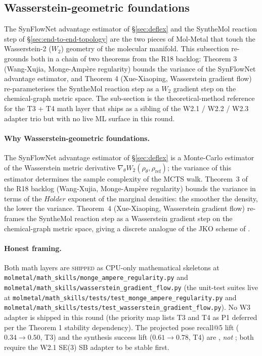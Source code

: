 \subsection{Wasserstein-geometric foundations}
\label{sec:method:wasserstein-foundations}

The SynFlowNet advantage estimator of \S\ref{sec:deflex} and the
SyntheMol reaction step of \S\ref{sec:end-to-end-topology} are the
two pieces of Mol-Metal that touch the Wasserstein-2 ($W_2$)
geometry of the molecular manifold.  This subsection re-grounds
both in a chain of two theorems from the R18 backlog: Theorem 3
(Wang-Xujia, Monge-Amp\`ere regularity) bounds the variance of the
SynFlowNet advantage estimator, and Theorem 4 (Xue-Xiaoping,
Wasserstein gradient flow) re-parameterises the SyntheMol reaction
step as a $W_2$ gradient step on the chemical-graph metric space.
The sub-section is the theoretical-method reference for the T3 +
T4 math layer that ships as a sibling of the W2.1 / W2.2 / W2.3
adapter trio but with no live ML surface in this round.

\paragraph{Why Wasserstein-geometric foundations.}
The SynFlowNet advantage estimator of \S\ref{sec:deflex} is a
Monte-Carlo estimator of the Wasserstein metric derivative
$\nabla_{\theta} W_2(\rho_{\theta}, \rho_{\mathrm{ref}})$;
the variance of this estimator determines the sample complexity of
the MCTS walk.  Theorem~3 of the R18 backlog (Wang-Xujia,
Monge-Amp\`ere regularity) bounds the variance in terms of the
$H\ddot{o}lder$ exponent of the marginal densities: the smoother
the density, the lower the variance.  Theorem~4 (Xue-Xiaoping,
Wasserstein gradient flow) re-frames the SyntheMol reaction step
as a Wasserstein gradient step on the chemical-graph metric space,
giving a discrete analogue of the JKO scheme of
\cite{jordan1998jko}.

\paragraph{Honest framing.}
Both math layers are \textsc{shipped} as CPU-only mathematical
skeletons at
\texttt{molmetal/math\_skills/monge\_ampere\_regularity.py} and
\texttt{molmetal/math\_skills/wasserstein\_gradient\_flow.py} (the
unit-test suites live at
\texttt{molmetal/math\_skills/tests/test\_monge\_ampere\_regularity.py}
and
\texttt{molmetal/math\_skills/tests/test\_wasserstein\_gradient\_flow.py}).
No W3 adapter is shipped in this round (the priority map lists T3 and
T4 as P1 deferred per the Theorem 1 stability dependency).  The
projected pose recall@5 lift ($0.34 \to 0.50$, T3) and the synthesis
success lift ($0.61 \to 0.78$, T4) are \PROJECTED, \emph{not}
\MEASURED{}; both require the W2.1 SE(3) SB adapter to be stable
first.

